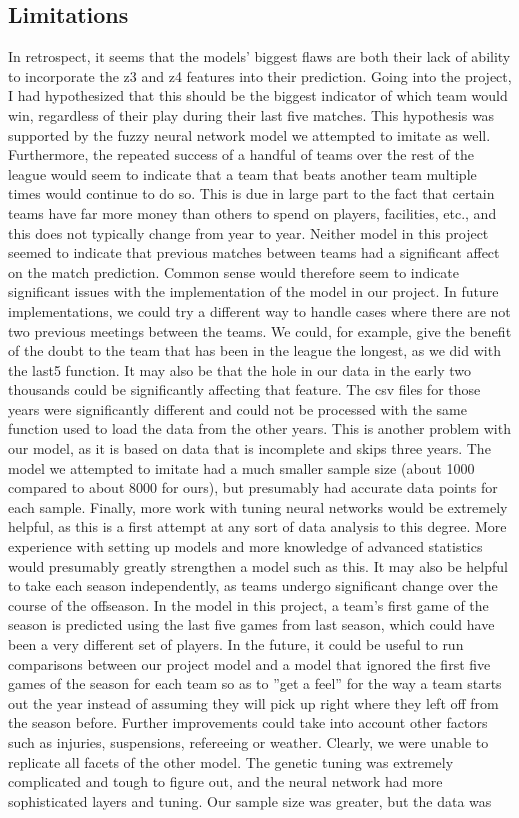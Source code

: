 \documentclass[sigconf]{acmart}
\begin{document}
\subsection{Limitations}
In retrospect, it seems that the models' biggest flaws are both their lack of ability to incorporate the z3 and z4 features into their prediction. Going into the project, I had hypothesized that this should be the biggest indicator of which team would win, regardless of their play during their last five matches. This hypothesis was supported by the fuzzy neural network model we attempted to imitate as well. Furthermore, the repeated success of a handful of teams over the rest of the league would seem to indicate that a team that beats another team multiple times would continue to do so. This is due in large part to the fact that certain teams have far more money than others to spend on players, facilities, etc., and this does not typically change from year to year. Neither model in this project seemed to indicate that previous matches between teams had a significant affect on the match prediction. Common sense would therefore seem to indicate significant issues with the implementation of the model in our project. In future implementations, we could try a different way to handle cases where there are not two previous meetings between the teams. We could, for example, give the benefit of the doubt to the team that has been in the league the longest, as we did with the last5 function. It may also be that the hole in our data in the early two thousands could be significantly affecting that feature. The csv files for those years were significantly different and could not be processed with the same function used to load the data from the other years. This is another problem with our model, as it is based on data that is incomplete and skips three years. The model we attempted to imitate had a much smaller sample size (about 1000 compared to about 8000 for ours), but presumably had accurate data points for each sample. Finally, more work with tuning neural networks would be extremely helpful, as this is a first attempt at any sort of data analysis to this degree. More experience with setting up models and more knowledge of advanced statistics would presumably greatly strengthen a model such as this. It may also be helpful to take each season independently, as teams undergo significant change over the course of the offseason. In the model in this project, a team's first game of the season is predicted using the last five games from last season, which could have been a very different set of players. In the future, it could be useful to run comparisons between our project model and a model that ignored the first five games of the season for each team so as to ''get a feel'' for the way a team starts out the year instead of assuming they will pick up right where they left off from the season before. Further improvements could take into account other factors such as injuries, suspensions, refereeing or weather. Clearly, we were unable to replicate all facets of the other model. The genetic tuning was extremely complicated and tough to figure out, and the neural network had more sophisticated layers and tuning. Our sample size was greater, but the data was 
\end{document}
